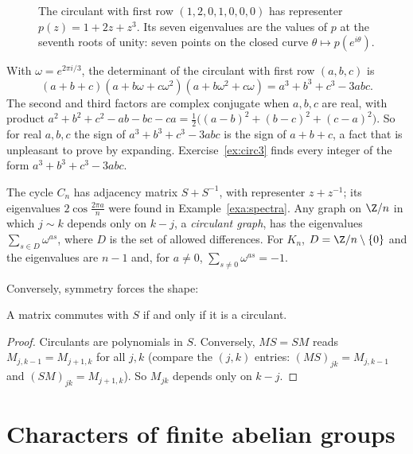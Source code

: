 \begin{figure}[ht]
\centering
{}
\caption{The circulant with first row $(1,2,0,1,0,0,0)$ has representer $p(z)=1+2z+z^3$. Its seven eigenvalues are the values
of $p$ at the seventh roots of unity: seven points on the closed curve $\theta\mapsto p(e^{i\theta})$.}
\label{fig:circulant}
\end{figure}

\begin{example}\label{exa:circ3}
With $\omega=e^{2\pi i/3}$, the determinant of the circulant with first row $(a,b,c)$ is
\[
(a+b+c)(a+b\omega+c\omega^2)(a+b\omega^2+c\omega)=a^3+b^3+c^3-3abc.
\]
The second and third factors are complex conjugate when $a,b,c$ are real, with product $a^2+b^2+c^2-ab-bc-ca=\frac12\bigl((a-b)^2+
(b-c)^2+(c-a)^2\bigr)$. So for real $a,b,c$ the sign of $a^3+b^3+c^3-3abc$ is the sign of $a+b+c$, a fact that is unpleasant to
prove by expanding. Exercise~\ref{ex:circ3} finds every integer of the form $a^3+b^3+c^3-3abc$.
\end{example}

\begin{example}\label{exa:cycle}
The cycle $C_n$ has adjacency matrix $S+S^{-1}$, with representer $z+z^{-1}$; its eigenvalues $2\cos\frac{2\pi a}n$ were
found in Example~\ref{exa:spectra}. Any graph on $\Z/n$ in which $j\sim k$ depends only on $k-j$, a \emph{circulant graph},
has the eigenvalues $\sum_{s\in D}\omega^{as}$, where $D$ is the set of allowed differences. For $K_n$, $D=\Z/n\setminus\{0\}$ and
the eigenvalues are $n-1$ and, for $a\ne0$, $\sum_{s\ne0}\omega^{as}=-1$.
\end{example}

Conversely, symmetry forces the shape:

\begin{proposition}\label{prop:commutant}
A matrix commutes with $S$ if and only if it is a circulant.
\end{proposition}
\begin{proof}
Circulants are polynomials in $S$. Conversely, $MS=SM$ reads $M_{j,k-1}=M_{j+1,k}$ for all $j,k$ (compare the $(j,k)$ entries:
$(MS)_{jk}=M_{j,k-1}$ and $(SM)_{jk}=M_{j+1,k}$). So $M_{jk}$ depends only on $k-j$.
\end{proof}

\section{Characters of finite abelian groups}

